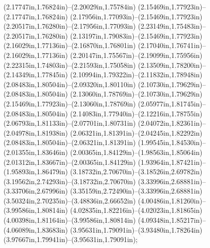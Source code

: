 (2.17747in,1.76824in)--(2.20029in,1.75784in) (2.15469in,1.77923in)--(2.17747in,1.76824in) (2.17956in,1.77093in)--(2.15469in,1.77923in) (2.20517in,1.76280in)--(2.17956in,1.77093in) (2.23149in,1.75483in)--(2.20517in,1.76280in) (2.13197in,1.79083in)--(2.15469in,1.77923in) (2.16029in,1.77136in)--(2.16870in,1.76801in) (2.17040in,1.76741in)--(2.16029in,1.77136in) (2.20147in,1.75567in)--(2.19099in,1.75956in) (2.22315in,1.74803in)--(2.21593in,1.75058in) (2.13509in,1.78200in)--(2.14349in,1.77845in) (2.10994in,1.79322in)--(2.11832in,1.78948in) (2.08483in,1.80504in)--(2.09320in,1.80110in) (2.10730in,1.79629in)--(2.08483in,1.80504in) (2.13060in,1.78769in)--(2.10730in,1.79629in) (2.15469in,1.77923in)--(2.13060in,1.78769in) (2.05977in,1.81745in)--(2.08483in,1.80504in) (2.14083in,1.77940in)--(2.12216in,1.78755in) (2.06793in,1.81133in)--(2.07701in,1.80731in) (2.04072in,1.82361in)--(2.04978in,1.81938in) (2.06321in,1.81391in)--(2.04245in,1.82292in) (2.08483in,1.80504in)--(2.06321in,1.81391in) (1.99545in,1.84530in)--(2.01355in,1.83646in) (2.00365in,1.84129in)--(1.98563in,1.85064in) (2.01312in,1.83667in)--(2.00365in,1.84129in) (1.93964in,1.87421in)--(1.95893in,1.86479in) (3.18732in,2.70670in)--(3.18526in,2.69782in) (3.19562in,2.74293in)--(3.18732in,2.70670in) (3.33996in,2.68881in)--(3.33706in,2.67996in) (3.35159in,2.72490in)--(3.33996in,2.68881in) (3.50324in,2.70235in)--(3.48836in,2.66652in) (4.00486in,1.81260in)--(3.99586in,1.80814in) (4.02835in,1.82216in)--(4.02023in,1.81865in) (4.00398in,1.81164in)--(3.99586in,1.80814in) (4.09348in,1.85217in)--(4.06089in,1.83683in) (3.95631in,1.79091in)--(3.93480in,1.78264in) (3.97667in,1.79941in)--(3.95631in,1.79091in);
